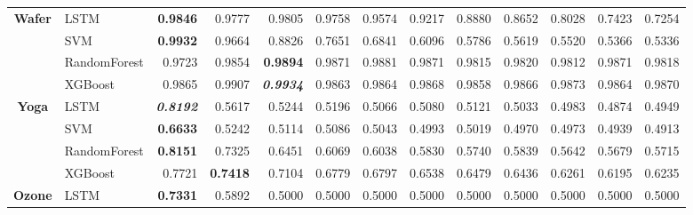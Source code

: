 \begin{table}[H]
\begin{adjustbox}{max width=12cm}
\begin{tabular}{|c|l|r|r|r|r|r|r|r|r|r|r|r|}
			\hline
			\textbf{Wafer}        & LSTM         & \textbf{0.9846}          & 0.9777          & 0.9805                   & 0.9758                   & 0.9574          & 0.9217                   & 0.8880 & 0.8652 & 0.8028                   & 0.7423          & 0.7254          \\
			                      & SVM          & \textbf{0.9932}          & 0.9664          & 0.8826                   & 0.7651                   & 0.6841          & 0.6096                   & 0.5786 & 0.5619 & 0.5520                   & 0.5366          & 0.5336          \\
			                      & RandomForest & 0.9723                   & 0.9854          & \textbf{0.9894}          & 0.9871                   & 0.9881          & 0.9871                   & 0.9815 & 0.9820 & 0.9812                   & 0.9871          & 0.9818          \\
			                      & XGBoost      & 0.9865                   & 0.9907          & \textit{\textbf{0.9934}} & 0.9863                   & 0.9864          & 0.9868                   & 0.9858 & 0.9866 & 0.9873                   & 0.9864          & 0.9870          \\
			\hline
			\textbf{Yoga}         & LSTM         & \textit{\textbf{0.8192}} & 0.5617          & 0.5244                   & 0.5196                   & 0.5066          & 0.5080                   & 0.5121 & 0.5033 & 0.4983                   & 0.4874          & 0.4949          \\
			                      & SVM          & \textbf{0.6633}          & 0.5242          & 0.5114                   & 0.5086                   & 0.5043          & 0.4993                   & 0.5019 & 0.4970 & 0.4973                   & 0.4939          & 0.4913          \\
			                      & RandomForest & \textbf{0.8151}          & 0.7325          & 0.6451                   & 0.6069                   & 0.6038          & 0.5830                   & 0.5740 & 0.5839 & 0.5642                   & 0.5679          & 0.5715          \\
			                      & XGBoost      & 0.7721                   & \textbf{0.7418} & 0.7104                   & 0.6779                   & 0.6797          & 0.6538                   & 0.6479 & 0.6436 & 0.6261                   & 0.6195          & 0.6235          \\
			\hline
			\textbf{Ozone}        & LSTM         & \textbf{0.7331}          & 0.5892          & 0.5000                   & 0.5000                   & 0.5000          & 0.5000                   & 0.5000 & 0.5000 & 0.5000                   & 0.5000          & 0.5000          \\

\end{tabular}
\end{adjustbox}
\end{table}

